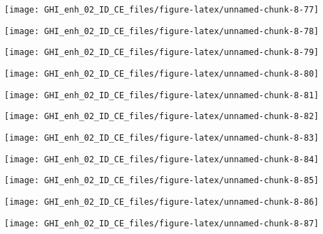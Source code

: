 \documentclass[
  10pt,
  a4paper,oneside]{article}
\begin{document}
\begin{center}\texttt{[image: GHI\_enh\_02\_ID\_CE\_files/figure-latex/unnamed-chunk-8-77]} \end{center}

\begin{center}\texttt{[image: GHI\_enh\_02\_ID\_CE\_files/figure-latex/unnamed-chunk-8-78]} \end{center}

\begin{center}\texttt{[image: GHI\_enh\_02\_ID\_CE\_files/figure-latex/unnamed-chunk-8-79]} \end{center}

\begin{center}\texttt{[image: GHI\_enh\_02\_ID\_CE\_files/figure-latex/unnamed-chunk-8-80]} \end{center}

\begin{center}\texttt{[image: GHI\_enh\_02\_ID\_CE\_files/figure-latex/unnamed-chunk-8-81]} \end{center}

\begin{center}\texttt{[image: GHI\_enh\_02\_ID\_CE\_files/figure-latex/unnamed-chunk-8-82]} \end{center}

\begin{center}\texttt{[image: GHI\_enh\_02\_ID\_CE\_files/figure-latex/unnamed-chunk-8-83]} \end{center}

\begin{center}\texttt{[image: GHI\_enh\_02\_ID\_CE\_files/figure-latex/unnamed-chunk-8-84]} \end{center}

\begin{center}\texttt{[image: GHI\_enh\_02\_ID\_CE\_files/figure-latex/unnamed-chunk-8-85]} \end{center}

\begin{center}\texttt{[image: GHI\_enh\_02\_ID\_CE\_files/figure-latex/unnamed-chunk-8-86]} \end{center}

\begin{center}\texttt{[image: GHI\_enh\_02\_ID\_CE\_files/figure-latex/unnamed-chunk-8-87]} \end{center}
\end{document}

